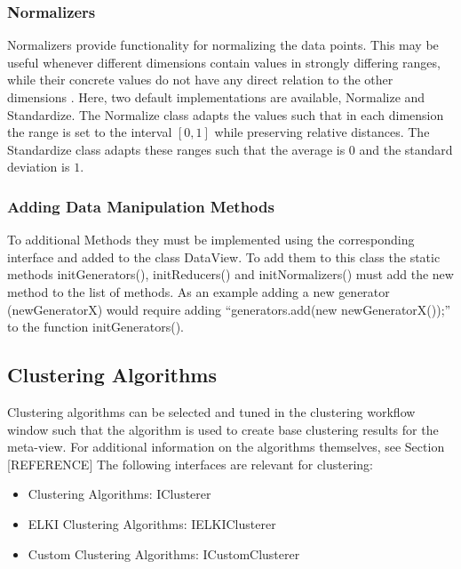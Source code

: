 \documentclass[
	a4paper,
	english,
	twoside,
	openright,               
	11pt                            
	]{report}
\begin{document}
\subsubsection{Normalizers}
Normalizers provide functionality for normalizing the data points. This may be useful whenever different dimensions contain values in strongly differing ranges, while their concrete values do not have any direct relation to the other dimensions \cite{normalization}. Here, two default implementations are available, Normalize and Standardize. The Normalize class adapts the values such that in each dimension the range is set to the interval $[0,1]$ while preserving relative distances. The Standardize class adapts these ranges such that the average is $0$ and the standard deviation is $1$.

\subsubsection*{Adding Data Manipulation Methods}
To additional Methods they must be implemented using the corresponding interface and added to the class DataView. To add them to this class the static methods initGenerators(), initReducers() and initNormalizers() must add the new method to the list of methods. As an example adding a new generator (newGeneratorX) would require adding ``generators.add(new newGeneratorX());'' to the function initGenerators().

\subsection{Clustering Algorithms}
Clustering algorithms can be selected and tuned in the clustering workflow window such that the algorithm is used to create base clustering results for the meta-view. For additional information on the algorithms themselves, see Section [REFERENCE] The following interfaces are relevant for clustering:

\begin{itemize}
  \item Clustering Algorithms: IClusterer
  \item ELKI Clustering Algorithms: IELKIClusterer
  \item Custom Clustering Algorithms: ICustomClusterer
\end{itemize}
\end{document}

